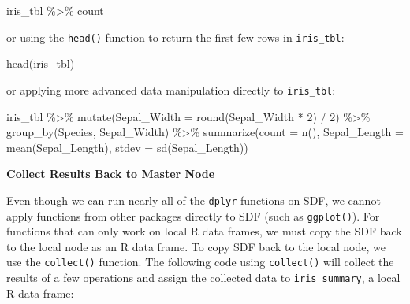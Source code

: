 \documentclass[
  12pt,
]{krantz}
\makeatletter
\newenvironment{Shaded}{\begin{snugshade}}{\end{snugshade}}
\newcommand{\AttributeTok}[1]{\textcolor[rgb]{0.61,0.61,0.61}{#1}}
\newcommand{\DecValTok}[1]{\textcolor[rgb]{0.06,0.06,0.06}{#1}}
\newcommand{\FunctionTok}[1]{\textcolor[rgb]{0,0,0}{#1}}
\newcommand{\NormalTok}[1]{#1}
\newcommand{\SpecialCharTok}[1]{\textcolor[rgb]{0,0,0}{#1}}
\newenvironment{kframe}{%
\medskip{}
\setlength{\fboxsep}{.8em}
 \def\at@end@of@kframe{}%
 \ifinner\ifhmode%
  \def\at@end@of@kframe{\end{minipage}}%
  \begin{minipage}{\columnwidth}%
 \fi\fi%
 \def\FrameCommand##1{\hskip\@totalleftmargin \hskip-\fboxsep
 \colorbox{shadecolor}{##1}\hskip-\fboxsep
     \hskip-\linewidth \hskip-\@totalleftmargin \hskip\columnwidth}%
 \MakeFramed {\advance\hsize-\width
   \@totalleftmargin\z@ \linewidth\hsize
   \@setminipage}}%
 {\par\unskip\endMakeFramed%
 \at@end@of@kframe}
\renewenvironment{Shaded}{\begin{kframe}}{\end{kframe}}
\makeatother
\begin{document}
\begin{Shaded}
\begin{Highlighting}[]
\NormalTok{iris\_tbl }\SpecialCharTok{\%\textgreater{}\%}\NormalTok{ count}
\end{Highlighting}
\end{Shaded}

or using the \texttt{head()} function to return the first few rows in \texttt{iris\_tbl}:

\begin{Shaded}
\begin{Highlighting}[]
\FunctionTok{head}\NormalTok{(iris\_tbl)}
\end{Highlighting}
\end{Shaded}

or applying more advanced data manipulation directly to \texttt{iris\_tbl}:

\begin{Shaded}
\begin{Highlighting}[]
\NormalTok{iris\_tbl }\SpecialCharTok{\%\textgreater{}\%}
  \FunctionTok{mutate}\NormalTok{(}\AttributeTok{Sepal\_Width =} \FunctionTok{round}\NormalTok{(Sepal\_Width }\SpecialCharTok{*} \DecValTok{2}\NormalTok{) }\SpecialCharTok{/} \DecValTok{2}\NormalTok{) }\SpecialCharTok{\%\textgreater{}\%}
  \FunctionTok{group\_by}\NormalTok{(Species, Sepal\_Width) }\SpecialCharTok{\%\textgreater{}\%}
  \FunctionTok{summarize}\NormalTok{(}\AttributeTok{count =} \FunctionTok{n}\NormalTok{(), }\AttributeTok{Sepal\_Length =} \FunctionTok{mean}\NormalTok{(Sepal\_Length), }
            \AttributeTok{stdev =} \FunctionTok{sd}\NormalTok{(Sepal\_Length))}
\end{Highlighting}
\end{Shaded}

\textbf{Collect Results Back to Master Node}

Even though we can run nearly all of the \texttt{dplyr} functions on SDF, we cannot apply functions from other packages directly to SDF (such as \texttt{ggplot()}). For functions that can only work on local R data frames, we must copy the SDF back to the local node as an R data frame. To copy SDF back to the local node, we use the \texttt{collect()} function. The following code using \texttt{collect()} will collect the results of a few operations and assign the collected data to \texttt{iris\_summary}, a local R data frame:
\end{document}
